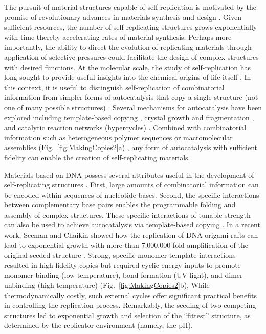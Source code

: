 \begin{appendices}
The pursuit of material structures capable of self-replication is motivated by the promise of revolutionary advances in materials synthesis and design \cite{He2017}. Given sufficient resources, the number of self-replicating structures grows exponentially with time thereby accelerating rates of material synthesis.  Perhaps more importantly, the ability to direct the evolution of replicating materials through application of selective pressures could facilitate the design of complex structures with desired functions.  At the molecular scale, the study of self-replication has long sought to provide useful insights into the chemical origins of life itself \cite{Orgel1992,ruiz2013prebiotic}. In this context, it is useful to distinguish self-replication of combinatorial information from simpler forms of autocatalysis that copy a single structure (not one of many possible structures) \cite{schulman2012robust}. Several mechanisms for autocatalysis have been explored including template-based copying \cite{Wang2011, He2017},  crystal growth and fragmentation \cite{Viedma2005,carnall2010mechanosensitive}, and catalytic reaction networks (hypercycles) \cite{Eigen1977, Zeravcic2014}. Combined with combinatorial information such as heterogeneous polymer sequences or macromolecular assemblies (Fig.~\ref{fig:MakingCopies2}a) \cite{sadownik2016diversification}, any form of autocatalysis with sufficient fidelity \cite{Eigen1988} can enable the creation of self-replicating materials.

Materials based on DNA \cite{Jones2015} possess several attributes useful in the development of self-replicating structures \cite{Wang2011, schulman2012robust, He2017}.  First, large amounts of combinatorial information can be encoded within sequences of nucleotide bases. Second, the specific interactions between complementary base pairs enables the programmable folding and assembly of complex structures.  These specific interactions of tunable strength can also be used to achieve autocatalysis via template-based copying \cite{Wang2011, He2017}.  In a recent work, Seeman and Chaikin showed how the replication of DNA origami rafts can lead to exponential growth with more than 7,000,000-fold amplification of the original seeded structure \cite{He2017}.  Strong, specific monomer-template interactions resulted in high fidelity copies but required cyclic energy inputs to promote monomer binding (low temperature), bond formation (UV light), and dimer unbinding (high temperature) (Fig.~\ref{fig:MakingCopies2}b). While thermodynamically costly, such external cycles offer significant practical benefits in controlling the replication process.  Remarkably, the seeding of two competing structures led to exponential growth and selection of the ``fittest'' structure, as determined by the replicator environment (namely, the pH).


\end{appendices}
